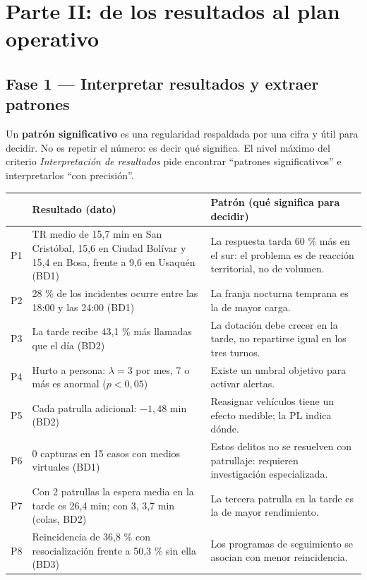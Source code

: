 \section{Parte II: de los resultados al plan operativo}

\subsection{Fase 1 --- Interpretar resultados y extraer patrones}

Un \textbf{patrón significativo} es una regularidad respaldada por una cifra y útil para
decidir. No es repetir el número: es decir qué significa. El nivel máximo del criterio
\textit{Interpretación de resultados} pide encontrar ``patrones significativos'' e
interpretarlos ``con precisión''.

\begin{center}
\footnotesize
\begin{tabularx}{\textwidth}{@{}p{0.5cm}XX@{}}
\toprule
& \textbf{Resultado (dato)} & \textbf{Patrón (qué significa para decidir)}\\
\midrule
P1 & TR medio de 15,7 min en San Cristóbal, 15,6 en Ciudad Bolívar y 15,4 en Bosa, frente a 9,6 en Usaquén (BD1) & La respuesta tarda 60 \% más en el sur: el problema es de reacción territorial, no de volumen.\\
P2 & 28 \% de los incidentes ocurre entre las 18:00 y las 24:00 (BD1) & La franja nocturna temprana es la de mayor carga.\\
P3 & La tarde recibe 43,1 \% más llamadas que el día (BD2) & La dotación debe crecer en la tarde, no repartirse igual en los tres turnos.\\
P4 & Hurto a persona: $\lambda=3$ por mes, 7 o más es anormal ($p<0{,}05$) & Existe un umbral objetivo para activar alertas.\\
P5 & Cada patrulla adicional: $-1{,}48$ min (BD2) & Reasignar vehículos tiene un efecto medible; la PL indica dónde.\\
P6 & 0 capturas en 15 casos con medios virtuales (BD1) & Estos delitos no se resuelven con patrullaje: requieren investigación especializada.\\
P7 & Con 2 patrullas la espera media en la tarde es 26,4 min; con 3, 3,7 min (colas, BD2) & La tercera patrulla en la tarde es la de mayor rendimiento.\\
P8 & Reincidencia de 36,8 \% con resocialización frente a 50,3 \% sin ella (BD3) & Los programas de seguimiento se asocian con menor reincidencia.\\
\bottomrule
\end{tabularx}
\end{center}

